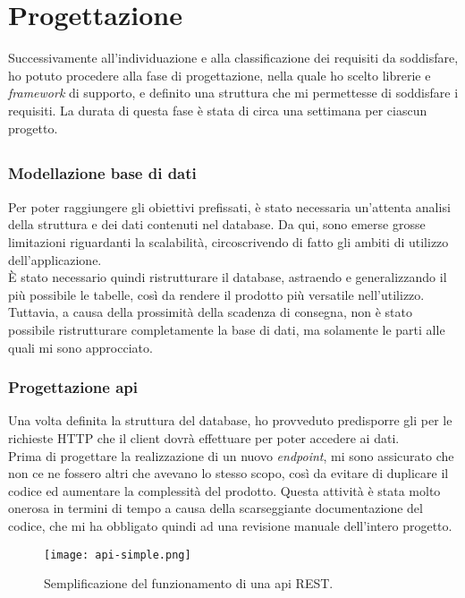 \section{Progettazione}
Successivamente all'individuazione e alla classificazione dei requisiti da soddisfare, ho potuto procedere alla fase di progettazione, nella quale ho scelto librerie e \textit{\gls{framework}} di supporto, e definito una struttura che mi permettesse di soddisfare i requisiti. La durata di questa fase è stata di circa una settimana per ciascun progetto.
\subsection{\DS}
\subsubsection{Modellazione base di dati}
Per poter raggiungere gli obiettivi prefissati, è stato necessaria un'attenta analisi della struttura e dei dati contenuti nel database. Da qui, sono emerse grosse limitazioni riguardanti la scalabilità, circoscrivendo di fatto gli ambiti di utilizzo dell'applicazione.\\
\`E stato necessario quindi ristrutturare il database, astraendo e generalizzando il più possibile le tabelle, così da rendere il prodotto più versatile nell'utilizzo. Tuttavia, a causa della prossimità della scadenza di consegna, non è stato possibile ristrutturare completamente la base di dati, ma solamente le parti alle quali mi sono approcciato.   
\subsubsection{Progettazione \acrshort{api}}
Una volta definita la struttura del database, ho provveduto predisporre gli  per le richieste HTTP che il \gls{client} dovrà effettuare per poter accedere ai dati.\\
Prima di progettare la realizzazione di un nuovo \textit{\gls{endpoint}}, mi sono assicurato che non ce ne fossero altri che avevano lo stesso scopo, così da evitare di duplicare il codice ed aumentare la complessità del prodotto. Questa attività è stata molto onerosa in termini di tempo a causa della scarseggiante documentazione del codice, che mi ha obbligato quindi ad una revisione manuale dell'intero progetto.
\begin{figure}[h]
\texttt{[image: api-simple.png]}
\centering
\caption{Semplificazione del funzionamento di una \acrshort{api} REST.} 
\label{fig:api-simple}
\end{figure}
